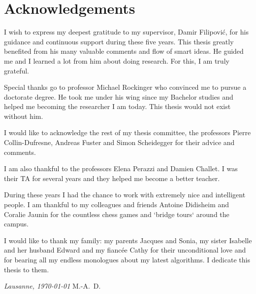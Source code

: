 \chapter*{Acknowledgements}

I wish to express my deepest gratitude to my supervisor, Damir Filipović, for his guidance and continuous support during these five years. This thesis greatly benefited from his many valuable comments and flow of smart ideas. He guided me and I learned a lot from him about doing research. For this, I am truly grateful.

Special thanks go to professor Michael Rockinger who convinced me to pursue a doctorate degree. He took me under his wing since my Bachelor studies and helped me becoming the researcher I am today. This thesis would not exist without him.

I would like to acknowledge the rest of my thesis committee, the professors Pierre Collin-Dufresne, Andreas Fuster and Simon Scheidegger for their advice and comments.

I am also thankful to the professors Elena Perazzi and Damien Challet. I was their TA for several years and they helped me become a better teacher.

During these years I had the chance to work with extremely nice and intelligent people. I am thankful to my colleagues and friends Antoine Didisheim and Coralie Jaunin for the countless chess games and `bridge tours` around the campus.

I would like to thank my family: my parents Jacques and Sonia, my sister Isabelle and her husband Edward and my fiancée Cathy for their unconditional love and for bearing all my endless monologues about my latest algorithms. I dedicate this thesis to them.

\bigskip
 
\noindent\textit{Lausanne, \today}
\hfill M.-A.~D.
